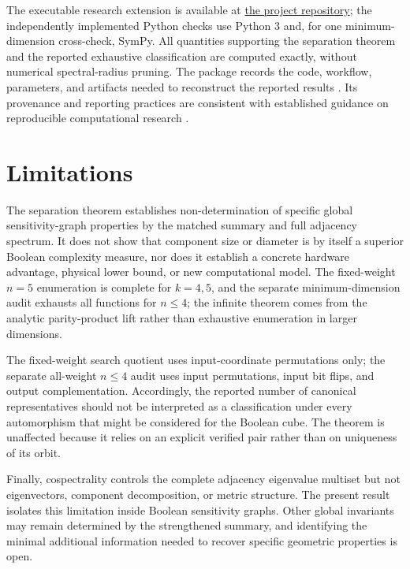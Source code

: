 \documentclass[twoside,12pt,letterpaper]{article}
\theoremstyle{definition}
\begin{document}
The executable research extension is available at \href{https://github.com/Arithmetic-Power-Geometry/Sensitivity-Graphs}{the project repository}; the independently implemented Python checks use Python 3 and, for one minimum-dimension cross-check, SymPy. All quantities supporting the separation theorem and the reported exhaustive classification are computed exactly, without numerical spectral-radius pruning. The package records the code, workflow, parameters, and artifacts needed to reconstruct the reported results \parencite{peng2011,sandve2013,stodden2014,wilkinson2016,pineau2021}. Its provenance and reporting practices are consistent with established guidance on reproducible computational research \parencite{gentleman2007,boettiger2015,feitelson2015,heroux2015,leek2017,collberg2016,stodden2016,ivie2018,plesser2018,rule2019,national2019}.

\section{Limitations}
The separation theorem establishes non-determination of specific global sensitivity-graph properties by the matched summary and full adjacency spectrum. It does not show that component size or diameter is by itself a superior Boolean complexity measure, nor does it establish a concrete hardware advantage, physical lower bound, or new computational model. The fixed-weight $n=5$ enumeration is complete for $k=4,5$, and the separate minimum-dimension audit exhausts all functions for $n\le4$; the infinite theorem comes from the analytic parity-product lift rather than exhaustive enumeration in larger dimensions.

The fixed-weight search quotient uses input-coordinate permutations only; the separate all-weight $n\le4$ audit uses input permutations, input bit flips, and output complementation. Accordingly, the reported number of canonical representatives should not be interpreted as a classification under every automorphism that might be considered for the Boolean cube. The theorem is unaffected because it relies on an explicit verified pair rather than on uniqueness of its orbit.

Finally, cospectrality controls the complete adjacency eigenvalue multiset but not eigenvectors, component decomposition, or metric structure. The present result isolates this limitation inside Boolean sensitivity graphs. Other global invariants may remain determined by the strengthened summary, and identifying the minimal additional information needed to recover specific geometric properties is open.
\end{document}
